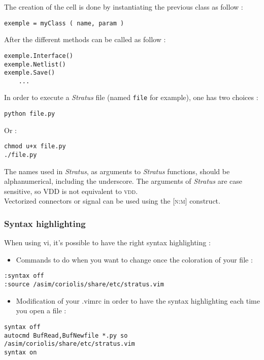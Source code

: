 \indent The creation of the cell is done by instantiating the previous class as follow :
\begin{verbatim}
exemple = myClass ( name, param )
\end{verbatim}

\indent After the different methods can be called as follow :
\begin{verbatim}
exemple.Interface()
exemple.Netlist()
exemple.Save()
    ...
\end{verbatim}


\indent In order to execute a \emph{Stratus} file (named \verb-file- for example), one has two choices :
\begin{verbatim}
python file.py
\end{verbatim}
\indent Or :
\begin{verbatim}
chmod u+x file.py
./file.py
\end{verbatim}

\indent The names used in \emph{Stratus}, as arguments to \emph{Stratus} functions, should be alphanumerical, including the underscore. The arguments of \emph{Stratus} are case sensitive, so \textsc{VDD} is not equivalent to \textsc{vdd}.\\
    
\indent Vectorized connectors or signal can be used using the \textsc{[n:m]} construct.\\

\subsubsection{Syntax highlighting}

When using vi, it's possible to have the right syntax highlighting :

\begin{itemize}
    \item Commands to do when you want to change once the coloration of your file :
\end{itemize}
\begin{small}
\begin{verbatim}
:syntax off
:source /asim/coriolis/share/etc/stratus.vim
\end{verbatim}
\end{small}
\begin{itemize}
    \item Modification of your .vimrc in order to have the syntax highlighting each time you open a file :
\end{itemize}
\begin{small}
\begin{verbatim}
syntax off
autocmd BufRead,BufNewfile *.py so /asim/coriolis/share/etc/stratus.vim
syntax on
\end{verbatim}
\end{small}
        
